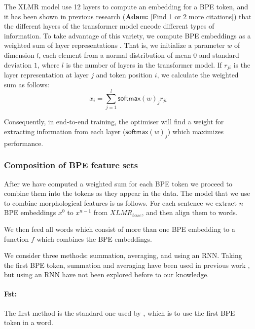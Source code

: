 \documentclass[11pt]{article}
\newcommand\adam[1]{(\textbf{Adam:} #1)}
\newcommand\citet{\newcite}
\newcommand\citep{\cite}
\newcommand\softmax{\mathsf{softmax}}
\begin{document}
                The XLMR model use 12 layers to compute an embedding
     for a BPE token, and it has been shown in previous research
     \citep{kondratyukstraka,raganato2018analysis,liu2019linguistic}
     \adam{[Find 1 or 2 more citations]} that the different layers of the
     transformer model encode different types of information. To take
     advantage of this variety, we compute BPE embeddings as a weighted sum of
     layer representations \citep{kondratyukstraka}.  That is, we
     initialize a parameter $w$ of dimension $l$, each element from a normal
     distribution of mean $0$ and standard deviation $1$, where $l$ is
     the number of layers in the transformer model. If $r_{ji}$ is the
     layer representation at layer $j$ and token position $i$, we
     calculate the weighted sum as follows:
    \begin{equation}
		x_i = \sum_{j=1}^{l} \softmax(w)_j r_{ji}
	\end{equation}

        Consequently, in end-to-end training, the optimiser will find
        a weight for extracting information from each layer
        ($\softmax(w)_j$) which maximizes performance.

     \subsubsection{Composition of BPE feature sets}
      After we have computed a weighted sum for
     each BPE token we proceed to combine them into the tokens as they
     appear in the data.
	The model that we use to combine morphological features is as
        follows. For each sentence we extract $n$ BPE embeddings $x^0$
        to $x^{n-1}$ from $XLMR_{base}$, and then align them to
        words.

        We then feed all words which consist of more than one
        BPE embedding to a function $f$ which combines the BPE
        embeddings.

                We consider three methods: summation, averaging, and
     using an RNN. Taking the first BPE token, summation and averaging
     have been used in previous work
     \citep{sachan2020syntax,kondratyuk2019cross,devlin2018bert}, but
     using an RNN have not been explored before to our knowledge.

        \paragraph{Fst:} The first method is the standard one used by
     \citet{devlin2018bert}, which is to use the first BPE token in a word.
    
\end{document}
